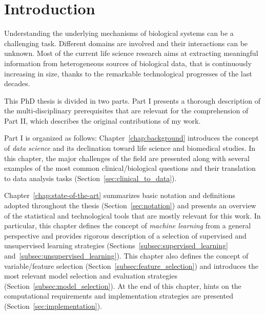 
\chapter{Introduction} \label{chapter:introduction}
Understanding the underlying mechanisms of biological systems can be a challenging task. Different domains are involved and their interactions can be unknown.
Most of the current life science research aims at extracting meaningful information from heterogeneous sources of biological data, that is continuously increasing in size, thanks to the remarkable technological progresses of the last decades.

This PhD thesis is divided in two parts. Part I presents a thorough description of the multi-disciplinary prerequisites that are relevant for the comprehension of Part II, which describes the original contributions of my work.

Part I is organized as follows: Chapter~\ref{chap:background} introduces the concept of \textit{data science} and its declination toward life science and biomedical studies. In this chapter, the major challenges of the field are presented along with several examples of the most common clinical/biological questions and their translation to data analysis tasks (Section~\ref{sec:clinical_to_data}).

Chapter~\ref{chap:state-of-the-art} summarizes basic notation and definitions adopted throughout the thesis (Section~\ref{sec:notation}) and presents an overview of the statistical and technological tools that are mostly relevant for this work. In particular, this chapter defines the concept of \textit{machine learning} from a general perspective and provides rigorous description of a selection of supervised and unsupervised learning strategies (Sections~\ref{subsec:supervised_learning} and~\ref{subsec:unsupervised_learning}).
This chapter also defines the concept of variable/feature selection (Section~\ref{subsec:feature_selection}) and introduces the most relevant model selection and evaluation strategies (Section~\ref{subsec:model_selection}).
At the end of this chapter, hints on the computational requirements and implementation strategies are presented (Section~\ref{sec:implementation}).

